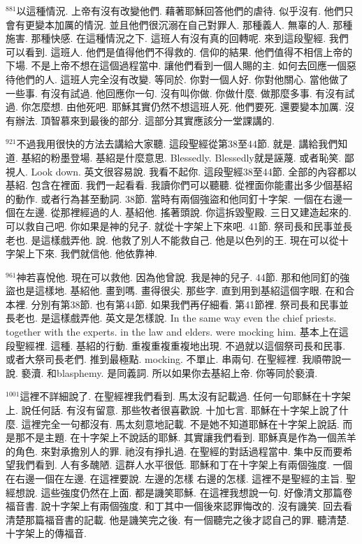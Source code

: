 \documentclass{book}
\begin{document}
$^{881}$以這種情況.
上帝有沒有改變他們.
藉著耶穌回答他們的虐待.
似乎沒有.
他們只會有更變本加厲的情況.
並且他們很沉溺在自己對罪人.
那種義人.
無辜的人.
那種施害.
那種快感.
在這種情況之下.
這班人有沒有真的回轉呢.
來到這段聖經.
我們可以看到.
這班人.
他們是值得他們不得救的.
信仰的結果.
他們值得不相信上帝的下場.
不是上帝不想在這個過程當中.
讓他們看到一個人賜的主.
如何去回應一個惡待他們的人.
這班人完全沒有改變.
等同於.
你對一個人好.
你對他關心.
當他做了一些事.
有沒有試過.
他回應你一句.
沒有叫你做.
你做什麼.
做那麼多事.
有沒有試過.
你怎麼想.
由他死吧.
耶穌其實仍然不想這班人死.
他們要死.
還要變本加厲.
沒有辦法.
頂智慕來到最後的部分.
這部分其實應該分一堂課講的.

$^{921}$不過我用很快的方法去講給大家聽.
這段聖經從第38至44節.
就是.
講給我們知道.
基紹的粉墨登場.
基紹是什麼意思.
Blessedly.
Blessedly就是誣蔑.
或者恥笑.
鄙視人.
Look down.
英文很容易說.
我看不起你.
這段聖經38至44節.
全部的內容都以基紹.
包含在裡面.
我們一起看看.
我讀你們可以聽聽.
從裡面你能畫出多少個基紹的動作.
或者行為甚至動詞.
38節.
當時有兩個強盜和他同釘十字架.
一個在右邊一個在左邊.
從那裡經過的人.
基紹他.
搖著頭說.
你這拆毀聖殿.
三日又建造起來的.
可以救自己吧.
你如果是神的兒子.
就從十字架上下來吧.
41節.
祭司長和民事並長老也.
是這樣戲弄他.
說.
他救了別人不能救自己.
他是以色列的王.
現在可以從十字架上下來.
我們就信他.
他依靠神.

$^{961}$神若喜悅他.
現在可以救他.
因為他曾說.
我是神的兒子.
44節.
那和他同釘的強盜也是這樣地.
基紹他.
畫到嗎.
畫得很尖.
那些字.
直到用到基紹這個字眼.
在和合本裡.
分別有第38節.
也有第44節.
如果我們再仔細看.
第41節裡.
祭司長和民事並長老也.
是這樣戲弄他.
英文是怎樣說.
In the same way even the chief priests.
together with the experts.
in the law and elders.
were mocking him.
基本上在這段聖經裡.
這種.
基紹的行動.
重複重複重複地出現.
不過就以這個祭司長和民事.
或者大祭司長老們.
推到最極點.
mocking.
不單止.
串兩句.
在聖經裡.
我順帶說一說.
褻瀆.
和blasphemy.
是同義詞.
所以如果你去基紹上帝.
你等同於褻瀆.

$^{1001}$這裡不詳細說了.
在聖經裡我們看到.
馬太沒有記載過.
任何一句耶穌在十字架上.
說任何話.
有沒有留意.
那些牧者很喜歡說.
十加七言.
耶穌在十字架上說了什麼.
這裡完全一句都沒有.
馬太刻意地記載.
不是她不知道耶穌在十字架上說話.
而是那不是主題.
在十字架上不說話的耶穌.
其實讓我們看到.
耶穌真是作為一個羔羊的角色.
來對承擔別人的罪.
祂沒有掙扎過.
在聖經的對話過程當中.
集中反而要希望我們看到.
人有多醜陋.
這群人水平很低.
耶穌和丁在十字架上有兩個強度.
一個在右邊一個在左邊.
在這裡要說.
左邊的怎樣 右邊的怎樣.
這裡不是聖經的主旨.
聖經想說.
這些強度仍然在上面.
都是譏笑耶穌.
在這裡我想說一句.
好像清文那篇卷福音書.
說十字架上有兩個強度.
和丁其中一個後來認罪悔改的.
沒有譏笑.
回去看清楚那篇福音書的記載.
他是譏笑完之後.
有一個聽完之後才認自己的罪.
聽清楚.
十字架上的傳福音.
\end{document}
